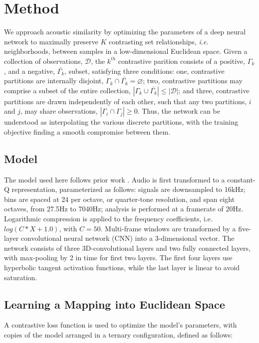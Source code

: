 \documentclass{article}
\begin{document}
\section{Method}

We approach acoustic similarity by optimizing the parameters of a deep neural network to maximally preserve $K$ contrasting set relationships, \emph{i.e.} neighborhoods, between samples in a low-dimensional Euclidean space.
Given a collection of observations, $\mathcal{D}$, the $k^{th}$ contrastive parition consists of a positive, $\Gamma_k$, and a negative, $\bar{\Gamma_k}$, subset, satisfying three conditions:
one, contrastive partitions are internally disjoint, $\Gamma_k \cap \bar{\Gamma_k} = \varnothing$;
two, contrastive partitions may comprise a subset of the entire collection, $|\Gamma_k \cup \bar{\Gamma_k}| \le |\mathcal{D}|$;
and three, contrastive partitions are drawn independently of each other, such that any two partitions, $i$ and $j$, may share observations, $|\Gamma_i \cap \Gamma_j| \ge 0$.
Thus, the network can be understood as interpolating the various discrete partitions, with the training objective finding a smooth compromise between them.


\subsection{Model}

The model used here follows prior work \cite{humphrey2015dl4mir}.
Audio is first transformed to a constant-Q representation, parameterized as follows:
signals are downsampled to 16kHz;
bins are spaced at 24 per octave, or quarter-tone resolution, and span eight octaves, from 27.5Hz to 7040Hz;
analysis is performed at a framerate of 20Hz.
Logarithmic compression is applied to the frequency coefficients, i.e. $log(C*X + 1.0)$, with $C=50$.
Multi-frame windows are transformed by a five-layer convolutional neural network (CNN) into a 3-dimensional vector.
The network consists of three 3D-convolutional layers and two fully connected layers, with max-pooling by 2 in time for first two layers.
The first four layers use hyperbolic tangent activation functions, while the last layer is linear to avoid saturation.


\subsection{Learning a Mapping into Euclidean Space}

A contrastive loss function is used to optimize the model's parameters,
with copies of the model arranged in a ternary configuration, defined as follows:
\end{document}
